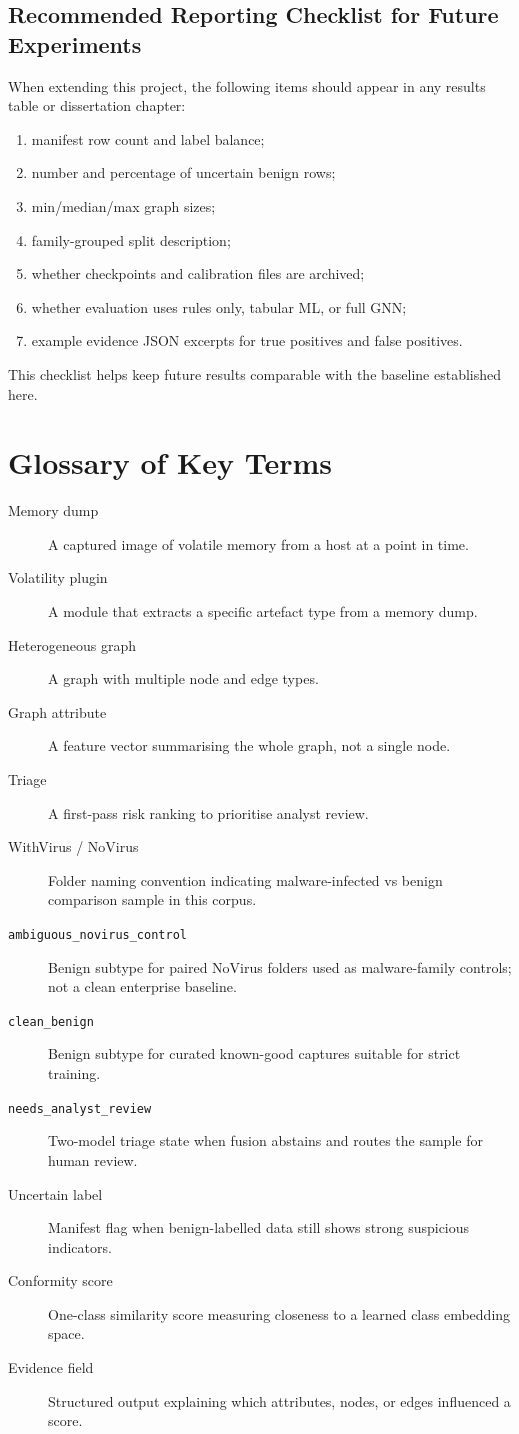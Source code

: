 \section{Recommended Reporting Checklist for Future Experiments}
When extending this project, the following items should appear in any results table or dissertation chapter:
\begin{enumerate}
\item manifest row count and label balance;
\item number and percentage of uncertain benign rows;
\item min/median/max graph sizes;
\item family-grouped split description;
\item whether checkpoints and calibration files are archived;
\item whether evaluation uses rules only, tabular ML, or full GNN;
\item example evidence JSON excerpts for true positives and false positives.
\end{enumerate}
This checklist helps keep future results comparable with the baseline established here.

\chapter{Glossary of Key Terms}
\begin{description}
\item[Memory dump] A captured image of volatile memory from a host at a point in time.
\item[Volatility plugin] A module that extracts a specific artefact type from a memory dump.
\item[Heterogeneous graph] A graph with multiple node and edge types.
\item[Graph attribute] A feature vector summarising the whole graph, not a single node.
\item[Triage] A first-pass risk ranking to prioritise analyst review.
\item[WithVirus / NoVirus] Folder naming convention indicating malware-infected vs benign comparison sample in this corpus.
\item[\texttt{ambiguous\_novirus\_control}] Benign subtype for paired NoVirus folders used as malware-family controls; not a clean enterprise baseline.
\item[\texttt{clean\_benign}] Benign subtype for curated known-good captures suitable for strict training.
\item[\texttt{needs\_analyst\_review}] Two-model triage state when fusion abstains and routes the sample for human review.
\item[Uncertain label] Manifest flag when benign-labelled data still shows strong suspicious indicators.
\item[Conformity score] One-class similarity score measuring closeness to a learned class embedding space.
\item[Evidence field] Structured output explaining which attributes, nodes, or edges influenced a score.
\end{description}

